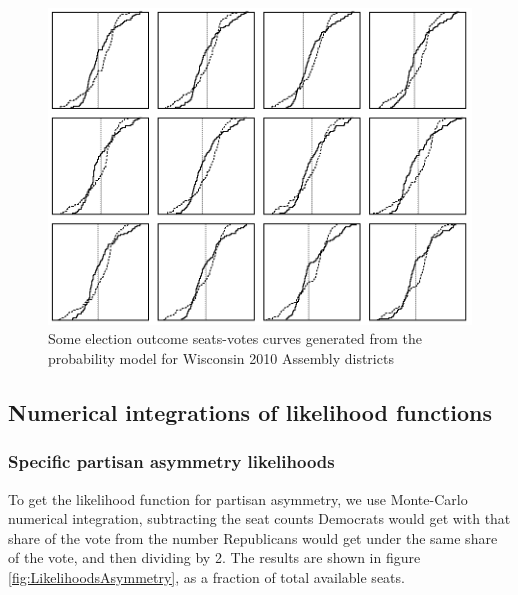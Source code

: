 \documentclass[preprint,12pt]{article}
\begin{document}
\begin{figure}[htb!]
    \begin{center}
        \includegraphics[scale=0.5]{../Figures/WI2010/sv_curves_assembly.png}
        \caption{Some election outcome seats-votes curves generated from the probability model for Wisconsin 2010 Assembly districts}\label{fig:SVAssembly}
    \end{center}
\end{figure}

\subsection{Numerical integrations of likelihood functions}

\subsubsection{Specific partisan asymmetry likelihoods}
 
To get the likelihood function for partisan asymmetry, we use Monte-Carlo numerical integration, subtracting the seat counts Democrats would get with that share of the vote from the number Republicans would get under the same share of the vote, and then dividing by 2. The results are shown in figure \ref{fig:LikelihoodsAsymmetry}, as a fraction of total available seats.
 
\end{document}
